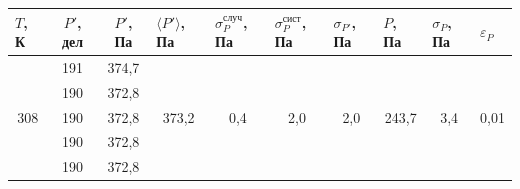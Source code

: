 \documentclass[a4paper,12pt]{article}
\begin{document}
\begin{table}[H]
\begin{tabular}{|c|c|c|c|c|c|c|c|c|c|}
\hline
\multicolumn{1}{|l|}{$ T $, К} & $ P' $, дел & $ P' $, Па & \multicolumn{1}{l|}{$ \langle P' \rangle $, Па} & \multicolumn{1}{l|}{$\sigma_P^{случ}$, Па} & \multicolumn{1}{l|}{$\sigma_P^{сист}$, Па} & \multicolumn{1}{l|}{$ \sigma_{P'} $, Па} & \multicolumn{1}{l|}{$ P $, Па} & \multicolumn{1}{l|}{$ \sigma_P $, Па} & \multicolumn{1}{l|}{$\varepsilon_P$} \\ \hline
\multirow{5}{*}{308}           & 191         & 374,7      & \multirow{5}{*}{373,2}                          & \multirow{5}{*}{0,4}                       & \multirow{5}{*}{2,0}                       & \multirow{5}{*}{2,0}                     & \multirow{5}{*}{243,7}         & \multirow{5}{*}{3,4}                  & \multirow{5}{*}{0,01}                \\ \cline{2-3}
                               & 190         & 372,8      &                                                 &                                            &                                            &                                          &                                &                                       &                                      \\ \cline{2-3}
                               & 190         & 372,8      &                                                 &                                            &                                            &                                          &                                &                                       &                                      \\ \cline{2-3}
                               & 190         & 372,8      &                                                 &                                            &                                            &                                          &                                &                                       &                                      \\ \cline{2-3}
                               & 190         & 372,8      &                                                 &                                            &                                            &                                          &                                &                                       &                                      \\ \hline
\end{tabular}
\end{table}
\end{document}
